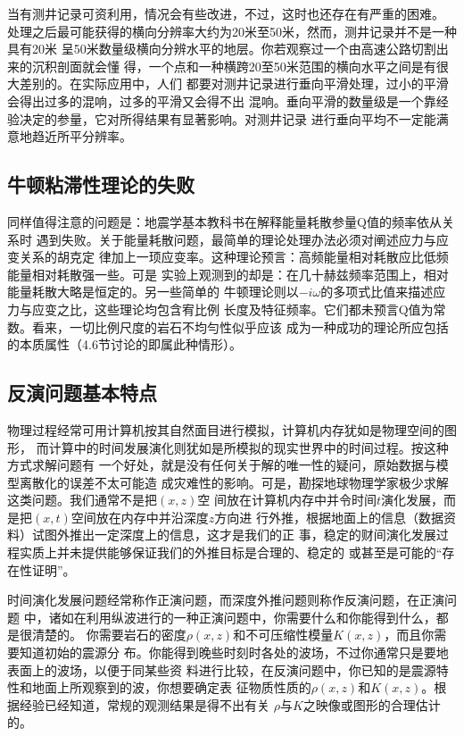 当有测井记录可资利用，情况会有些改进，不过，这时也还存在有严重的困难。
处理之后最可能获得的横向分辨率大约为20米至50米，然而，测井记录并不是一种具有20米
呈50米数量级横向分辨水平的地层。你若观察过一个由高速公路切割出来的沉积剖面就会懂
得，一个点和一种横跨20至50米范围的横向水平之间是有很大差别的。在实际应用中，人们
都要对测井记录进行垂向平滑处理，过小的平滑会得出过多的混响，过多的平滑又会得不出
混响。垂向平滑的数量级是一个靠经验决定的参量，它对所得结果有显著影响。对测井记录
进行垂向平均不一定能满意地趋近所平分辨率。

\subsection{牛顿粘滞性理论的失败}
同样值得注意的问题是：地震学基本教科书在解释能量耗散参量Q值的频率依从关系时
遇到失败。关于能量耗散问题，最简单的理论处理办法必须对阐述应力与应变关系的胡克定
律加上一顼应变率。这种理论预言：高频能量相对耗散应比低频能量相对耗散强一些。可是
实验上观测到的却是：在几十赫兹频率范围上，相对能量耗散大略是恒定的。另一些简单的
牛顿理论则以$-i\omega$的多项式比值来描述应力与应变之比，这些理论均包含宥比例
长度及特征频率。它们都未预言Q值为常数。看来，一切比例尺度的岩石不均勻性似乎应该
成为一种成功的理论所应包括的本质属性（4.6节讨论的即属此种情形）。

\subsection{反演问题基本特点}

物理过程经常可用计算机按其自然面目进行模拟，计算机内存犹如是物理空间的图形，
而计算中的时间发展演化则犹如是所模拟的现实世界中的时间过程。按这种方式求解问题有
一个好处，就是没有任何关于解的唯一性的疑问，原始数据与模型离散化的误差不太可能造
成灾难性的影响。可是，勘探地球物理学家极少求解这类问题。我们通常不是把$(x,z)$空
间放在计算机内存中并令时间$t$演化发展，而是把$(x,t)$空间放在内存中并沿深度$z$方向进
行外推，根据地面上的信息（数据资料）试图外推出一定深度上的信息，这才是我们的正
事，稳定的财间演化发展过程实质上并未提供能够保证我们的外推目标是合理的、稳定的
或甚至是可能的“存在性证明”。

时间演化发展问题经常称作正演问题，而深度外推问题则称作反演问题，在正演问题
中，诸如在利用纵波进行的一种正演问题中，你需要什么和你能得到什么，都是很清楚的。
你需要岩石的密度$\rho(x,z)$和不可压缩性模量$K(x,z)$，而且你需要知道初始的震源分
布。你能得到晚些时刻时各处的波场，不过你通常只是要地表面上的波场，以便于同某些资
料进行比较，在反演问题中，你已知的是震源特性和地面上所观察到的波，你想要确定表
征物质性质的$\rho(x,z)$和$K(x,z)$。根据经验已经知道，常规的观测结果是得不出有关
$\rho$与$K$之映像或图形的合理估计的。

